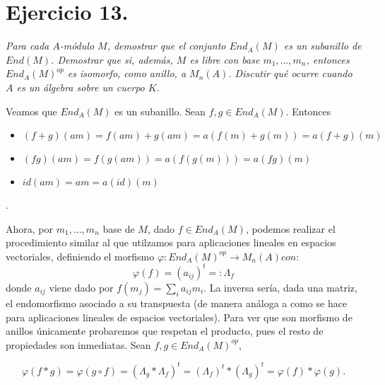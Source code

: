 \section{Ejercicio 13.}%
\label{sec:ejercicio_13_}

\textit{Para cada \(A\)-módulo \(M\), demostrar que el conjunto \(End_A(M)\) es un subanillo de \(End(M)\). Demostrar que si, además, \(M\) es libre con base \(m_1, \dots, m_n\), entonces \(End_A(M)^{op}\) es isomorfo, como anillo, a  \(M_n(A)\). Discutir qué ocurre cuando  \(A\) es un álgebra sobre un cuerpo \(K\)}.

Veamos que \(End_A(M)\) es un subanillo. Sean \(f,g \in End_A(M)\). Entonces
\begin{itemize}
    \item \((f+g)(am) = f(am) + g(am) = a(f(m) + g(m)) = a(f+g)(m)\)
    \item \((fg)(am) = f(g(am)) = a(f(g(m)))= a(fg)(m) \)
    \item \(id(am) = am = a(id)(m)\)
\end{itemize}.

Ahora, por \(m_1, \dots, m_n\) base de \(M\), dado \(f \in End_A(M)\), podemos realizar el procedimiento similar al que utilzamos para aplicaciones lineales en espacios vectoriales, definiendo el morfismo \(\varphi: End_A(M)^{op} \rightarrow M_n(A) con\):
\[
\varphi(f) = (a_{ij})^t =: \Lambda_f
\]
donde \(a_{ij}\) viene dado por \(f(m_j) = \sum_i a_{ij} m_i\). La inversa sería, dada una matriz, el endomorfismo asociado a su transpuesta (de manera análoga a como se hace para aplicaciones lineales de espacios vectoriales). Para ver que son morfismo de anillos únicamente probaremos que respetan el producto, pues el resto de propiedades son inmediatas. Sean \(f, g \in End_A(M)^{op}\),

\[
    \varphi(f*g) = \varphi(g \circ f) = (\Lambda_g * \Lambda_f)^t = (\Lambda_f)^t * (\Lambda_g)^t = \varphi(f) * \varphi(g)
.\]
